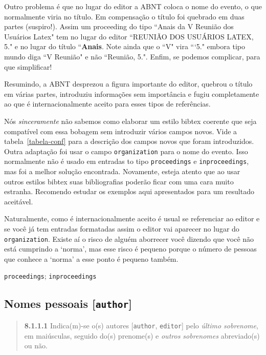 \documentclass[a4paper]{ltxdoc}
\begin{document}
Outro problema é que no lugar do editor a ABNT coloca o nome do evento, o que
normalmente viria no título. Em compensação o título foi quebrado em duas partes
(suspiro!). Assim um proceeding do tipo ``Anais da V Reunião dos Usuários Latex"
tem no lugar do editor ``REUNIÃO DOS USUÁRIOS LATEX, 5." e no lugar
do título ``{\bf Anais}. Note ainda que o ``V" vira ```5." embora
tipo mundo diga ``V Reunião" e não ``Reunião, 5.".
Enfim, se podemos complicar, para que simplificar!

Resumindo, a ABNT desprezou a figura importante do editor, quebrou o título
em várias partes, introduziu informações sem importância e fugiu completamente
ao que é internacionalmente aceito para esses tipos de referências.

Nós \emph{sinceramente} não sabemos como elaborar um estilo bibtex coerente que seja
compatível com essa bobagem sem introduzir vários campos novos.
Vide a tabela~\ref{tabela-conf} para a descrição dos campos novos que
foram introduzidos.
Outra adaptação foi usar o campo {\tt organization} para
o nome do evento. Isso normalmente não é usado em entradas to tipo
{\tt proceedings} e {\tt inproceedings}, mas foi a melhor solução encontrada.
Novamente, esteja atento que ao usar outros estilos bibtex suas bibliografias
poderão ficar com uma cara muito estranha. Recomendo estudar os exemplos
aqui apresentados para um resultado aceitável.

Naturalmente, como é internacionalmente aceito é usual se referenciar ao
editor e se você já tem entradas formatadas assim o editor vai aparecer
no lugar do {\tt organization}. Existe aí o risco de alguém aborrecer você
dizendo que você não está cumprindo a `norma', mas esse risco é pequeno
porque o número de pessoas que conhece a `norma' a esse ponto é
pequeno também.

{\tt proceedings}\cite{7.5.1.2-1,7.5.1.2-2,7.5.1.2-3,7.5.3-1,8.1.2.1-3};
{\tt inproceedings}\cite{7.5.2.2-1,7.5.2.2-2,7.5.2.2-3,7.5.3-2,7.5.3-3,7.5.3-4,7.5.3-5}

\subsection{Nomes pessoais [{\tt author}]}

\label{nome-pessoais}
\begin{quote}
{\bf 8.1.1.1}\cite{NBR6023:2000}
Indica(m)-se o(s) autores [{\tt author}, {\tt editor}]
pelo \emph{último sobrenome}, em maiúsculas, seguido
do(s) prenome(s) e \emph{outros sobrenomes} abreviado(s) ou não.
\cite{8.1.1.1-1,8.1.1.1-2}
\cite{8.1.1.1-1,8.1.1.1-2,8.1.1.1-3}
\end{quote}
\end{document}

